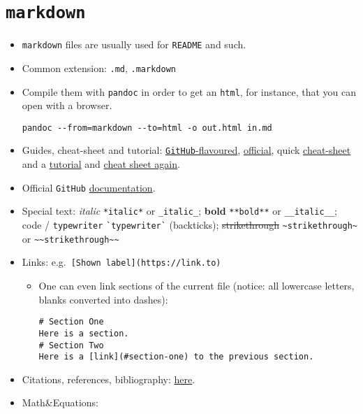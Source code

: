 \documentclass[a4paper,12pt,%
              final%
              ]{article}
\begin{document}
\section{\texttt{markdown}}
\label{sec:markdown}
\begin{itemize}
  \item \texttt{markdown} files are usually used for \texttt{README} and such.
  \item Common extension: \texttt{.md}, \texttt{.markdown}
  \item Compile them with \texttt{pandoc} in order to get an \texttt{html}, for instance, that you can open with a browser.
\begin{verbatim}
pandoc --from=markdown --to=html -o out.html in.md
\end{verbatim}
  \item Guides, cheat-sheet and tutorial:
    \href{https://github.com/adam-p/markdown-here/wiki/Markdown-Cheatsheet}{\texttt{GitHub}-flavoured},
    \href{https://daringfireball.net/projects/markdown/syntax}{official}, quick
    \href{https://commonmark.org/help/}{cheat-sheet} and a
    \href{https://agea.github.io/tutorial.md/}{tutorial} and
    \href{https://enterprise.github.com/downloads/en/markdown-cheatsheet.pdf}{cheat sheet again}.
  \item Official \texttt{GitHub} \href{https://docs.github.com/en/github/writing-on-github/basic-writing-and-formatting-syntax}{documentation}.
  \item Special text: \textit{italic} \verb|*italic*| or \verb|_italic_|; \textbf{bold} \verb|**bold**| or \verb|__italic__|; code / \texttt{typewriter} \verb|`typewriter`| (backticks); \sout{strikethrough} \verb|~strikethrough~| or \verb|~~strikethrough~~|
    \item Links: e.g.~\verb|[Shown label](https://link.to)|
      \begin{itemize}
        \item One can even link sections of the current file (notice: all lowercase letters, blanks converted into dashes):
\begin{verbatim}
# Section One
Here is a section.
# Section Two
Here is a [link](#section-one) to the previous section.
\end{verbatim}
      \end{itemize}
  \item Citations, references, bibliography: \href{https://stackoverflow.com/questions/26587527/cite-a-paper-using-github-markdown-syntax}{here}.
  \item Math\&Equations:

\end{itemize}
\end{document}

